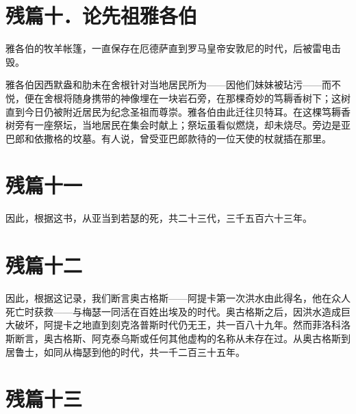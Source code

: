 
\section{残篇十．论先祖雅各伯}

雅各伯的牧羊帐篷，一直保存在厄德萨直到罗马皇帝安敦尼的时代，后被雷电击毁。\par

雅各伯因西默盎和肋未在舍根针对当地居民所为——因他们妹妹被玷污——而不悦，便在舍根将随身携带的神像埋在一块岩石旁，在那棵奇妙的笃耨香树下；这树直到今日仍被附近居民为纪念圣祖而尊崇。雅各伯由此迁往贝特耳。在这棵笃耨香树旁有一座祭坛，当地居民在集会时献上；祭坛虽看似燃烧，却未烧尽。旁边是亚巴郎和依撒格的坟墓。有人说，曾受亚巴郎款待的一位天使的杖就插在那里。\par


\section{残篇十一}

因此，根据这书，从亚当到若瑟的死，共二十三代，三千五百六十三年。\par


\section{残篇十二}

因此，根据这记录，我们断言奥古格斯——阿提卡第一次洪水由此得名，他在众人死亡时获救——与梅瑟一同活在百姓出埃及的时代。奥古格斯之后，因洪水造成巨大破坏，阿提卡之地直到刻克洛普斯时代仍无王，共一百八十九年。然而菲洛科洛斯断言，奥古格斯、阿克泰乌斯或任何其他虚构的名称从未存在过。从奥古格斯到居鲁士，如同从梅瑟到他的时代，共一千二百三十五年。\par


\section{残篇十三}

